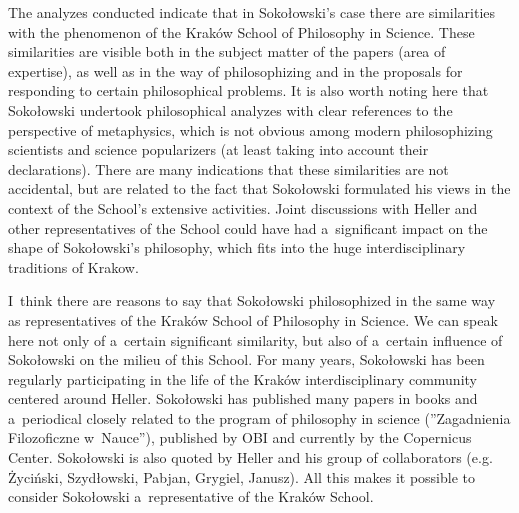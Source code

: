 \documentclass[%
  manuscript=article,
  year=2024,
  volume=77,
  doi=00000.000,
]{zfn}
\begin{document}
The analyzes conducted indicate that in Sokołowski's case there are similarities with the phenomenon of the Kraków School of Philosophy in Science. These similarities are visible both in the subject matter of the papers (area of expertise), as well as in the way of philosophizing and in the proposals for responding to certain philosophical problems. It is also worth noting here that Sokołowski undertook philosophical analyzes with clear references to the perspective of metaphysics, which is not obvious among modern philosophizing scientists and science popularizers (at least taking into account their declarations). There are many indications that these similarities are not accidental, but are related to the fact that Sokołowski formulated his views in the context of the School's extensive activities. Joint discussions with Heller and other representatives of the School could have had a~significant impact on the shape of Sokołowski's philosophy, which fits into the huge interdisciplinary traditions of Krakow.



I~think there are reasons to say that Sokołowski philosophized in the same way as representatives of the Kraków School of Philosophy in Science. We can speak here not only of a~certain significant similarity, but also of a~certain influence of Sokołowski on the milieu of this School. For many years, Sokołowski has been regularly participating in the life of the Kraków interdisciplinary community centered around Heller. Sokołowski has published many papers in books and a~periodical closely related to the program of philosophy in science (''Zagadnienia Filozoficzne w~Nauce''), published by OBI and currently by the Copernicus Center. Sokołowski is also quoted by Heller and his group of collaborators (e.g. Życiński, Szydłowski, Pabjan, Grygiel, Janusz). All this makes it possible to consider Sokołowski a~representative of the Kraków School.
\end{document}

